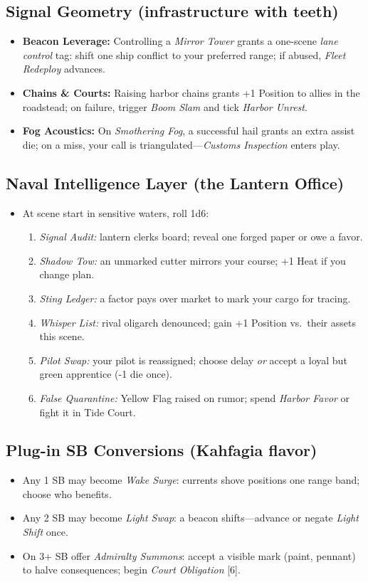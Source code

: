 \subsection*{Signal Geometry (infrastructure with teeth)}
\begin{itemize}
  \item \textbf{Beacon Leverage:} Controlling a \emph{Mirror Tower} grants a one-scene \emph{lane control} tag: shift one ship conflict to your preferred range; if abused, \emph{Fleet Redeploy} advances.
  \item \textbf{Chains \& Courts:} Raising harbor chains grants +1 Position to allies in the roadstead; on failure, trigger \emph{Boom Slam} and tick \emph{Harbor Unrest}.
  \item \textbf{Fog Acoustics:} On \emph{Smothering Fog}, a successful hail grants an extra assist die; on a miss, your call is triangulated—\emph{Customs Inspection} enters play.
\end{itemize}

\subsection*{Naval Intelligence Layer (the Lantern Office)}
\begin{itemize}
  \item At scene start in sensitive waters, roll 1d6:
  \begin{enumerate}
    \item \emph{Signal Audit:} lantern clerks board; reveal one forged paper or owe a favor.
    \item \emph{Shadow Tow:} an unmarked cutter mirrors your course; +1 Heat if you change plan.
    \item \emph{Sting Ledger:} a factor pays over market to mark your cargo for tracing.
    \item \emph{Whisper List:} rival oligarch denounced; gain +1 Position vs.\ their assets this scene.
    \item \emph{Pilot Swap:} your pilot is reassigned; choose delay \emph{or} accept a loyal but green apprentice (-1 die once).
    \item \emph{False Quarantine:} Yellow Flag raised on rumor; spend \emph{Harbor Favor} or fight it in Tide Court.
  \end{enumerate}
\end{itemize}

\subsection*{Plug-in SB Conversions (Kahfagia flavor)}
\begin{itemize}
  \item Any 1 SB may become \emph{Wake Surge}: currents shove positions one range band; choose who benefits.
  \item Any 2 SB may become \emph{Light Swap}: a beacon shifts—advance or negate \emph{Light Shift} once.
  \item On 3+ SB offer \emph{Admiralty Summons}: accept a visible mark (paint, pennant) to halve consequences; begin \emph{Court Obligation} [6].
\end{itemize}

